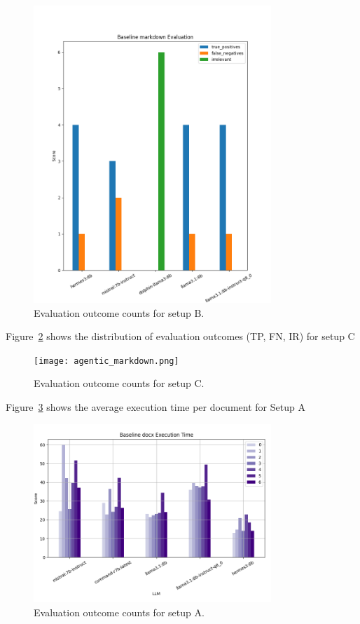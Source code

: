 \begin{figure}[H]
  \centering
  \includegraphics[width=0.8\textwidth]{baseline_markdown.png}
  \caption{Evaluation outcome counts for setup B.}
  \label{fig:baseline_markdown}
\end{figure}

Figure~\ref{fig:agentic_markdown} shows the distribution of evaluation outcomes
(TP, FN, IR) for setup C

\begin{figure}[H]
  \centering
  \texttt{[image: agentic\_markdown.png]}
  \caption{Evaluation outcome counts for setup C.}
  \label{fig:agentic_markdown}
\end{figure}

Figure~\ref{fig:baseline_docxexecution_time} shows the average execution time
per document for Setup A

\begin{figure}[H]
  \centering
  \includegraphics[width=0.8\textwidth]{baseline_docxexecution_time.png}
  \caption{Evaluation outcome counts for setup A.}
  \label{fig:baseline_docxexecution_time}
\end{figure}

